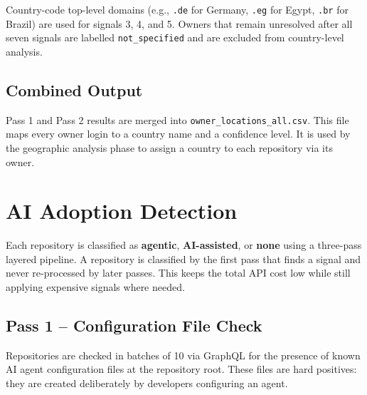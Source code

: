 \documentclass[11pt, a4paper]{article}
\begin{document}
Country-code top-level domains (e.g., \texttt{.de} for Germany, \texttt{.eg}
for Egypt, \texttt{.br} for Brazil) are used for signals 3, 4, and 5.
Owners that remain unresolved after all seven signals are labelled
\texttt{not\_specified} and are excluded from country-level analysis.

\subsection*{Combined Output}

Pass 1 and Pass 2 results are merged into \texttt{owner\_locations\_all.csv}.
This file maps every owner login to a country name and a confidence level.
It is used by the geographic analysis phase to assign a country to each
repository via its owner.

\newpage

\section{AI Adoption Detection}

Each repository is classified as \textbf{agentic}, \textbf{AI-assisted}, or
\textbf{none} using a three-pass layered pipeline. A repository is classified
by the first pass that finds a signal and never re-processed by later passes.
This keeps the total API cost low while still applying expensive signals where
needed.

\subsection*{Pass 1 -- Configuration File Check}

Repositories are checked in batches of 10 via GraphQL for the presence of
known AI agent configuration files at the repository root. These files are
hard positives: they are created deliberately by developers configuring an
agent.
\end{document}

